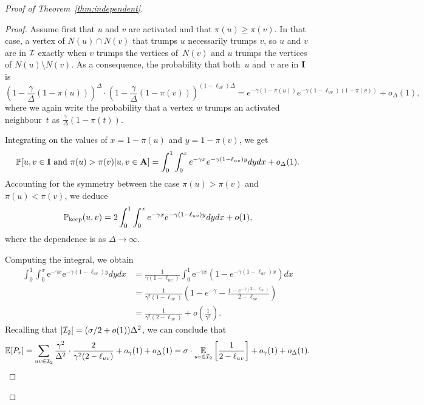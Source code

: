 \begin{proof}[Proof of Theorem~\ref{thm:independent}]
\begin{proof}
Assume first that $u$ and $v$ are activated and that $\pi(u)\geq\pi(v)$.
In that case, a vertex of $N(u)\cap N(v)$ that trumps $u$ necessarily trumps $v$,
so $u$ and $v$ are in ${\mathcal{I}}$ exactly when $v$ trumps the vertices of~$N(v)$
and $u$ trumps the vertices of $N(u)\setminus N(v)$.
As a consequence, the probability that both~$u$ and~$v$ are in ${\bf{I}}$ is
\[
        \left(1-\frac{\gamma}{\Delta}(1-\pi(u))\right)^\Delta\cdot
        \left(1-\frac{\gamma}{\Delta}(1-\pi(v))\right)^{(1-\ell_{uv})\Delta}
        = e^{-\gamma(1-\pi(u))}e^{-\gamma(1-\ell_{uv})(1-\pi(v))}+o_\Delta(1),
\]
where we again write the probability that a vertex $w$ trumps
an activated neighbour~$t$ as $\frac{\gamma}{\Delta}(1-\pi(t))$.

Integrating on the values of $x=1-\pi(u)$ and $y=1-\pi(v)$, we get
\[
   \mathbb{P}[u,v\in{\bf{I}}\text{ and }\pi(u)>\pi(v)| u,v\in{\bf{A}}]=
   \int_0^1\int_0^xe^{-\gamma x}e^{-\gamma(1-\ell_{uv})y} dydx + o_\Delta(1).
\]
Accounting for the symmetry between the case $\pi(u)>\pi(v)$ and $\pi(u)<\pi(v)$,
we deduce
\[
    \mathbb{P}_{\text{keep}}(u,v)=2\int_0^1\int_0^xe^{-\gamma x}e^{-\gamma(1-\ell_{uv})y} dydx + o(1),
\]
where the dependence is as $\Delta\to\infty$.

Computing the integral, we obtain
\begin{align*}
  \int_0^1\int_0^x\mathrm{e}^{-\gamma x}\mathrm{e}^{-\gamma \left(1-\ell_{uv}\right)y} dydx &=
  \frac{1}{\gamma(1-\ell_{uv})}\int_0^1\mathrm{e}^{-\gamma x}\left(1-e^{-\gamma(1-\ell_{uv})x}\right) dx \\
  &=
  \frac{1}{\gamma^2(1-\ell_{uv})}\left(
        1-e^{-\gamma}-\frac{1-e^{-\gamma(2-\ell_{uv})}}{2-\ell_{uv}}
\right)\\
  &= \frac{1}{\gamma^2(2-\ell_{uv})} + o\left(\frac{1}{\gamma^2}\right).
\end{align*}
Recalling that $|{\mathcal{I}}_2|=(\sigma/2+o(1))\Delta^2$,
we can conclude that
\[
  \mathbb{E}[P_r] =
  \sum_{uv\in {\mathcal{I}}_2}\frac{\gamma^2}{\Delta^2}\cdot\frac{2}{\gamma^2(2-\ell_{uv})}
  +o_\gamma(1)+o_\Delta(1)
  =\sigma\cdot\underset{uv\in{\mathcal{I}}_2}{\mathbb{E}}\left[\frac{1}{2-\ell_{uv}}\right]+o_\gamma(1)+o_\Delta(1).\qedhere
\]
\end{proof}


\end{proof}
